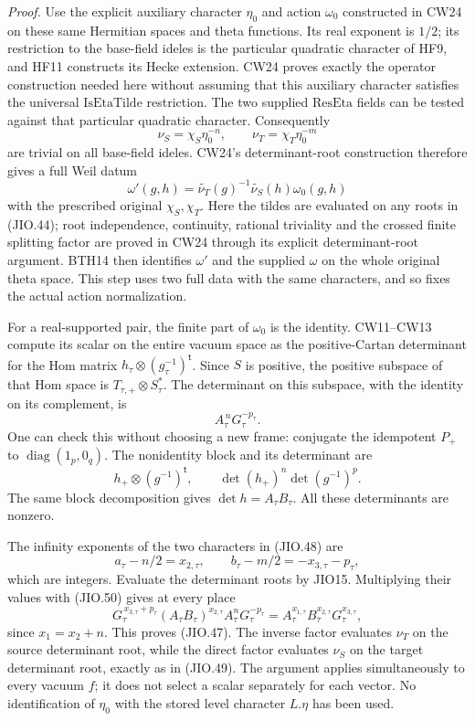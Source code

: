 \emph{Proof.}
Use the explicit auxiliary character \(\eta_0\) and action
\(\omega_0\) constructed in CW24 on these same Hermitian
spaces and theta functions.  Its real exponent is \(1/2\);
its restriction to the base-field ideles is the particular
quadratic character of HF9, and HF11 constructs its Hecke
extension.  CW24 proves
exactly the operator construction needed here without assuming
that this auxiliary character satisfies the universal
\(\mathrm{IsEtaTilde}\) restriction.
The two supplied \(\mathrm{ResEta}\) fields can be tested
against that particular quadratic character.  Consequently
\[
          \nu_S=\chi_S\eta_0^{-n},\qquad
          \nu_T=\chi_T\eta_0^{-m}
 \tag{JIO.48}
\]
are trivial on all base-field ideles.  CW24's determinant-root
construction therefore gives a full Weil datum
\[
       \omega'(g,h)=\widetilde{\nu_T}(g)^{-1}
                          \widetilde{\nu_S}(h)\omega_0(g,h)
 \tag{JIO.49}
\]
with the prescribed original \(\chi_S,\chi_T\).
Here the tildes are evaluated on any roots in (JIO.44);
root independence, continuity, rational triviality and the
crossed finite splitting factor are proved in CW24 through
its explicit determinant-root argument.
BTH14 then identifies \(\omega'\) and the supplied \(\omega\)
on the whole original theta space.  This step uses two full
data with the same characters, and so fixes the actual action
normalization.

For a real-supported pair, the finite part of \(\omega_0\)
is the identity.  CW11--CW13 compute its scalar on the entire
vacuum space as the positive-Cartan determinant for the Hom
matrix \(h_\tau\otimes(g_\tau^{-1})^{\mathsf t}\).
Since \(S\) is positive, the positive subspace of that Hom
space is \(T_{\tau,+}\otimes S_\tau^*\).
The determinant on this subspace, with the identity on its
complement, is
\[
                          A_\tau^{\,n}G_\tau^{-p_\tau}.
 \tag{JIO.50}
\]
One can check this without choosing a new frame: conjugate
the idempotent \(P_+\) to \(\operatorname{diag}(1_{p},0_q)\).
The nonidentity block and its determinant are
\[
 h_+\otimes(g^{-1})^{\mathsf t},
 \qquad \det(h_+)^n\det(g^{-1})^p.
\]
The same block decomposition gives \(\det h=A_\tau B_\tau\).
All these determinants are nonzero.

The infinity exponents of the two characters in (JIO.48) are
\[
           a_\tau-n/2=x_{2,\tau},\qquad
           b_\tau-m/2=-x_{3,\tau}-p_\tau ,
 \tag{JIO.51}
\]
which are integers.  Evaluate the determinant roots by JIO15.
Multiplying their values with (JIO.50) gives at every place
\[
 G_\tau^{\,x_{3,\tau}+p_\tau}
       (A_\tau B_\tau)^{x_{2,\tau}}
       A_\tau^nG_\tau^{-p_\tau}
       =A_\tau^{x_{1,\tau}}B_\tau^{x_{2,\tau}}G_\tau^{x_{3,\tau}},
 \tag{JIO.52}
\]
since \(x_1=x_2+n\).
This proves (JIO.47).  The inverse factor evaluates
\(\nu_T\) on the source determinant root, while the direct
factor evaluates \(\nu_S\) on the target determinant root,
exactly as in (JIO.49).
The argument applies simultaneously to every vacuum \(f\);
it does not select a scalar separately for each vector.
No identification of \(\eta_0\) with the stored level
character \(L.\eta\) has been used.

